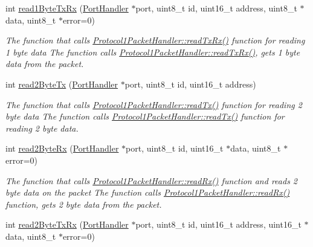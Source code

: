 \begin{DoxyCompactItemize}
int \hyperlink{classmercury_1_1_protocol1_packet_handler_a533b3b220c37ae8f37d00f051a13bf84}{read1\+Byte\+Tx\+Rx} (\hyperlink{classmercury_1_1_port_handler}{Port\+Handler} $\ast$port, uint8\+\_\+t id, uint16\+\_\+t address, uint8\+\_\+t $\ast$data, uint8\+\_\+t $\ast$error=0)
\begin{DoxyCompactList}\small\item\em The function that calls \hyperlink{classmercury_1_1_protocol1_packet_handler_af7212497f4f00a05122cb6ac9702acec}{Protocol1\+Packet\+Handler\+::read\+Tx\+Rx()} function for reading 1 byte data  The function calls \hyperlink{classmercury_1_1_protocol1_packet_handler_af7212497f4f00a05122cb6ac9702acec}{Protocol1\+Packet\+Handler\+::read\+Tx\+Rx()},  gets 1 byte data from the packet. \end{DoxyCompactList}\item 
int \hyperlink{classmercury_1_1_protocol1_packet_handler_a8e9e98bcaad903cc7db0e9d5a5cd1961}{read2\+Byte\+Tx} (\hyperlink{classmercury_1_1_port_handler}{Port\+Handler} $\ast$port, uint8\+\_\+t id, uint16\+\_\+t address)
\begin{DoxyCompactList}\small\item\em The function that calls \hyperlink{classmercury_1_1_protocol1_packet_handler_a06f83e8acee5de4f733cc26a865602c3}{Protocol1\+Packet\+Handler\+::read\+Tx()} function for reading 2 byte data  The function calls \hyperlink{classmercury_1_1_protocol1_packet_handler_a06f83e8acee5de4f733cc26a865602c3}{Protocol1\+Packet\+Handler\+::read\+Tx()} function for reading 2 byte data. \end{DoxyCompactList}\item 
int \hyperlink{classmercury_1_1_protocol1_packet_handler_aeb4b362fb84cb414842088148398bd31}{read2\+Byte\+Rx} (\hyperlink{classmercury_1_1_port_handler}{Port\+Handler} $\ast$port, uint8\+\_\+t id, uint16\+\_\+t $\ast$data, uint8\+\_\+t $\ast$error=0)
\begin{DoxyCompactList}\small\item\em The function that calls \hyperlink{classmercury_1_1_protocol1_packet_handler_a341885c5f9539e30f03946ea17884d02}{Protocol1\+Packet\+Handler\+::read\+Rx()} function and reads 2 byte data on the packet  The function calls \hyperlink{classmercury_1_1_protocol1_packet_handler_a341885c5f9539e30f03946ea17884d02}{Protocol1\+Packet\+Handler\+::read\+Rx()} function,  gets 2 byte data from the packet. \end{DoxyCompactList}\item 
int \hyperlink{classmercury_1_1_protocol1_packet_handler_a30d8ccfa15584cf00d60c57e95cf328b}{read2\+Byte\+Tx\+Rx} (\hyperlink{classmercury_1_1_port_handler}{Port\+Handler} $\ast$port, uint8\+\_\+t id, uint16\+\_\+t address, uint16\+\_\+t $\ast$data, uint8\+\_\+t $\ast$error=0)

\end{DoxyCompactItemize}
